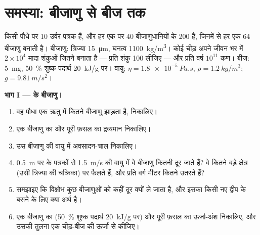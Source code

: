 \section{समस्या: बीजाणु से बीज तक}

\begin{problem}
\label{pb:b2:plant-life-cycles:1}
किसी  पौधे पर \num{10} उर्वर पत्रक हैं, और हर एक पर \num{40}
बीजाणुधानियों के \num{200}  हैं, जिनमें से हर एक \num{64} बीजाणु
बनाती है। बीजाणु: त्रिज्या \qty{15}{\micro m}, घनत्व \qty{1100}{kg/m^3}।
कोई चीड़ अपने जीवन भर में $2\times 10^{4}$ मादा शंकुओं जितने 
बनाता है --- प्रति शंकु \num{100}  लीजिए --- और प्रति वर्ष
$10^{11}$  कण। बीज: \qty{5}{mg}, \qty{50}{\%} शुष्क पदार्थ
\qty{20}{kJ/g} पर। वायु: $\eta = \qty{1.8e-5}{Pa.s}$, $\rho =
\qty{1.2}{kg/m^3}$; $g = \qty{9.81}{m/s^2}$।

\medskip
\noindent\textbf{भाग I ---  के बीजाणु।}
\begin{enumerate}
  \item वह पौधा एक ऋतु में कितने बीजाणु झाड़ता है, निकालिए।
  \item एक बीजाणु का और पूरी फ़सल का द्रव्यमान निकालिए।
  \item उस बीजाणु की वायु में अवसादन-चाल निकालिए।
  \item \qty{0.5}{m} पर के पत्रकों से \qty{1.5}{m/s} की वायु में वे
        बीजाणु कितनी दूर जाते हैं? वे कितने बड़े क्षेत्र (उसी त्रिज्या
        की चक्रिका) पर फैलते हैं, और प्रति वर्ग मीटर कितने उतरते हैं?
  \item समझाइए कि विक्षोभ कुछ बीजाणुओं को कहीं दूर क्यों ले जाता है,
        और इसका किसी नए द्वीप के बसने के लिए क्या अर्थ है।
  \item एक बीजाणु का (\qty{50}{\%} शुष्क पदार्थ \qty{20}{kJ/g} पर) और
        पूरी फ़सल का ऊर्जा-अंश निकालिए, और उसकी तुलना
        एक चीड़-बीज की ऊर्जा से कीजिए।
\end{enumerate}


\end{problem}
